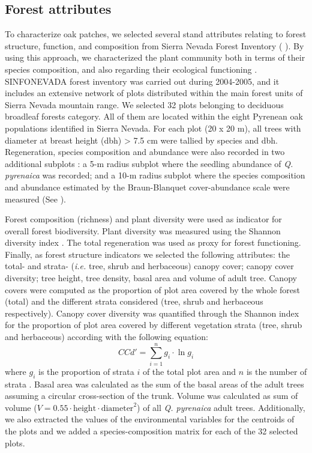 \subsection{Forest attributes}\label{sec:multivar:ForAtri}
To characterize oak patches, we selected several stand attributes relating to forest structure, function, and composition from Sierra Nevada Forest Inventory \autocite[SINFONEVADA,][]{PerezLuqueetal2014SinfonevadaDataset} ( ). By using this approach, we characterized the plant community both in terms of their species composition, and also regarding their ecological functioning \autocite{McElhinnyetal2005ForestWoodland,delRioetal2016CharacterizationStructure}. SINFONEVADA forest inventory was carried out during 2004-2005, and it includes an extensive network of plots distributed within the main forest units of Sierra Nevada mountain range. We selected 32 plots belonging to deciduous broadleaf forests category. All of them are located within the eight Pyrenean oak populations identified in Sierra Nevada. For each plot (20 x 20 m), all trees with diameter at breast height (dbh) \textgreater{} 7.5 cm were tallied by species and dbh. Regeneration, species composition and abundance were also recorded in two additional subplots \autocite[see][ for a detailed description]{PerezLuqueetal2014SinfonevadaDataset}: a 5-m radius subplot where the seedling abundance of \emph{Q. pyrenaica} was recorded; and a 10-m radius subplot where the species composition and abundance estimated by the Braun-Blanquet cover-abundance scale were measured \autocite{BraunBlanquet1964PflanzensoziologieGrundzuge} (See ).

Forest composition (richness) and plant diversity were used as indicator for overall forest biodiversity. Plant diversity was measured using the Shannon diversity index \autocite{Krebs1999EcologicalMethodology}. The total regeneration was used as proxy for forest functioning. Finally, as forest structure indicators we selected the following attributes: the total- and strata- (\emph{i.e.} tree, shrub and herbaceous) canopy cover; canopy cover diversity; tree height, tree density, basal area and volume of adult tree. Canopy covers were computed as the proportion of plot area covered by the whole forest (total) and the different strata considered (tree, shrub and herbaceous respectively). Canopy cover diversity was quantified through the Shannon index for the proportion of plot area covered by different vegetation strata (tree, shrub and herbaceous) according with the following equation: \[CCd'=\sum_{i=1}^{n} g_i \cdot \ln g_i\] where \(g_i\) is the proportion of strata \(i\) of the total plot area and \(n\) is the number of strata \autocite{DelRioetal2003IndicesStand}. Basal area was calculated as the sum of the basal areas of the adult trees assuming a circular cross-section of the trunk. Volume was calculated as sum of volume (\(V = 0.55 \cdot \textrm{height} \cdot \textrm{diameter}^2\)) of all \emph{Q. pyrenaica} adult trees. Additionally, we also extracted the values of the environmental variables for the centroids of the plots and we added a species-composition matrix for each of the 32 selected plots.

